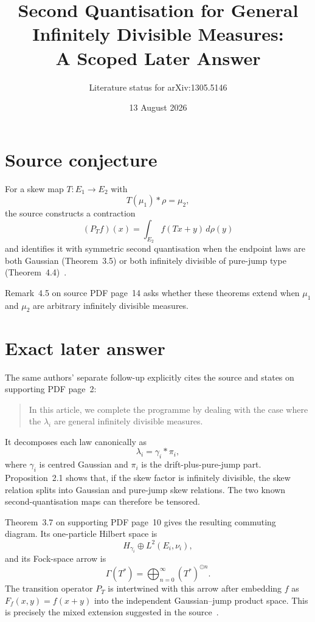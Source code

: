 \documentclass[11pt]{article}
\title{Second Quantisation for General Infinitely Divisible Measures:\\
A Scoped Later Answer}
\author{Literature status for arXiv:1305.5146}
\date{13 August 2026}
\begin{document}
\maketitle

\begin{center}
\end{center}

\section*{Source conjecture}

For a skew map $T:E_1\to E_2$ with
\[
 T(\mu_1)*\rho=\mu_2,
\]
the source constructs a contraction
\[
 (P_Tf)(x)=\int_{E_2}f(Tx+y)\,d\rho(y)
\]
and identifies it with symmetric second quantisation when the endpoint laws
are both Gaussian (Theorem~3.5) or both infinitely divisible of pure-jump
type (Theorem~4.4)~\cite{source}.

Remark~4.5 on source PDF page~14 asks whether these theorems extend when
$\mu_1$ and $\mu_2$ are arbitrary infinitely divisible measures.

\section*{Exact later answer}

The same authors' separate follow-up explicitly cites the source and states on
supporting PDF page~2:
\begin{quote}
In this article, we complete the programme by dealing with the case where the
$\lambda_i$ are general infinitely divisible measures.
\end{quote}
It decomposes each law canonically as
\[
 \lambda_i=\gamma_i*\pi_i,
\]
where $\gamma_i$ is centred Gaussian and $\pi_i$ is the drift-plus-pure-jump
part.  Proposition~2.1 shows that, if the skew factor is infinitely divisible,
the skew relation splits into Gaussian and pure-jump skew relations.  The two
known second-quantisation maps can therefore be tensored.

Theorem~3.7 on supporting PDF page~10 gives the resulting commuting diagram.
Its one-particle Hilbert space is
\[
 H_{\gamma_i}\oplus L^2(E_i,\nu_i),
\]
and its Fock-space arrow is
\[
 \Gamma(T^*)=
 \bigoplus_{n=0}^{\infty}(T^*)^{\odot n}.
\]
The transition operator $P_T$ is intertwined with this arrow after embedding
$f$ as $F_f(x,y)=f(x+y)$ into the independent Gaussian--jump product space.
This is precisely the mixed extension suggested in the source~\cite{answer}.
\end{document}
